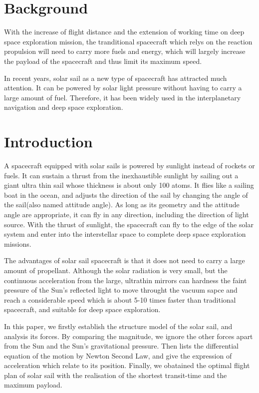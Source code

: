 \documentclass[../Paper.tex]{subfiles}
\begin{document}
\section{Background}

With the increase of flight distance and the extension of working time on deep space exploration mission, the tranditional spacecraft which relys on the reaction propulsion will need to carry more fuels and energy, which will largely increase the payload of the spacecraft and thus limit its maximum speed.            

In recent years, solar sail as a new type of spacecraft has attracted much attention. It can be powered by solar light pressure without having to carry a large amount of fuel. Therefore, it has been widely used in the interplanetary navigation and deep space exploration. 

\section{Introduction}	

A spacecraft equipped with solar sails is powered by sunlight instead of rockets or fuels. It can sustain a thrust from the inexhaustible sunlight by sailing out a giant ultra thin sail whose thickness is about only 100 atoms. It flies like a sailing boat in the ocean, and adjusts the direction of the sail by changing the angle of the sail(also named attitude angle). As long as its geometry and the attitude angle are appropriate, it can fly in any direction, including the direction of light source. With the thrust of sunlight, the spacecraft can fly to the edge of the solar system and enter into the interstellar space to complete deep space exploration missions. 

The advantages of solar sail spacecraft is that it does not need to carry a large amount of propellant. Although the solar radiation is very small, but the continuous acceleration from the large, ultrathin mirrors can hardness the faint pressure of the Sun's reflected light to move throught the vacuum sapce and reach a considerable speed which is about 5-10 times faster than traditional spacecraft, and suitable for deep space exploration.            

In this paper, we firstly establish the structure model of the solar sail, and analysis its forces. By comparing the magnitude, we ignore the other forces apart from the Sun and the Sun's gravitational pressure. Then lists the differential equation of the motion by Newton Second Law, and give the expression of acceleration which relate to its position. Finally, we obatained the optimal flight plan of solar sail with the realisation of the shortest transit-time and the maximum payload. 
\end{document}
